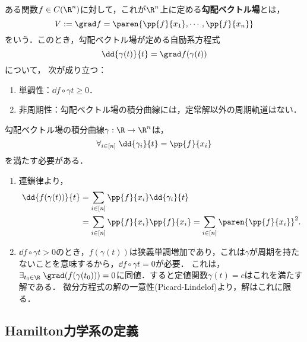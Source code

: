 \documentclass[uplatex,dvipdfmx]{jsreport}
\begin{document}
\begin{example}[勾配ベクトル場の積分曲線]
    ある関数$f\in C(\R^n)$に対して，これが$\R^n$上に定める\textbf{勾配ベクトル場}とは，
    \[V:=\grad f=\paren{\pp{f}{x_1},\cdots,\pp{f}{x_n}}\]
    をいう．このとき，勾配ベクトル場が定める自励系方程式
    \[\dd{\gamma(t)}{t}=\grad f(\gamma(t))\]
    について，
    次が成り立つ：
    \begin{enumerate}
        \item 単調性：$\dd{f\circ\gamma}{t}\ge0$．
        \item 非周期性：勾配ベクトル場の積分曲線には，定常解以外の周期軌道はない．
    \end{enumerate}
    \begin{Proof}
        勾配ベクトル場の積分曲線$\gamma:\R\to\R^n$は，
        \[\forall_{i\in[n]}\;\dd{\gamma_i}{t}=\pp{f}{x_i}\]
        を満たす必要がある．
        \begin{enumerate}
            \item 連鎖律より，
            \begin{align*}
                \dd{f(\gamma(t))}{t}&=\sum_{i\in[n]}\pp{f}{x_i}\dd{\gamma_i}{t}\\
                &=\sum_{i\in[n]}\pp{f}{x_i}\pp{f}{x_i}=\sum_{i\in[n]}\paren{\pp{f}{x_i}}^2.
            \end{align*}
            \item $\dd{f\circ\gamma}{t}>0$のとき，$f(\gamma(t))$は狭義単調増加であり，これは$\gamma$が周期を持たないことを意味するから，$\dd{f\circ\gamma}{t}=0$が必要．
            これは，$\exists_{t_0\in\R}\;\grad(f(\gamma(t_0)))=0$に同値．すると定値関数$\gamma(t)=c$はこれを満たす解である．
            微分方程式の解の一意性(Picard-Lindelof)より，解はこれに限る．
        \end{enumerate}
    \end{Proof}
\end{example}

\subsection{Hamilton力学系の定義}
\end{document}
